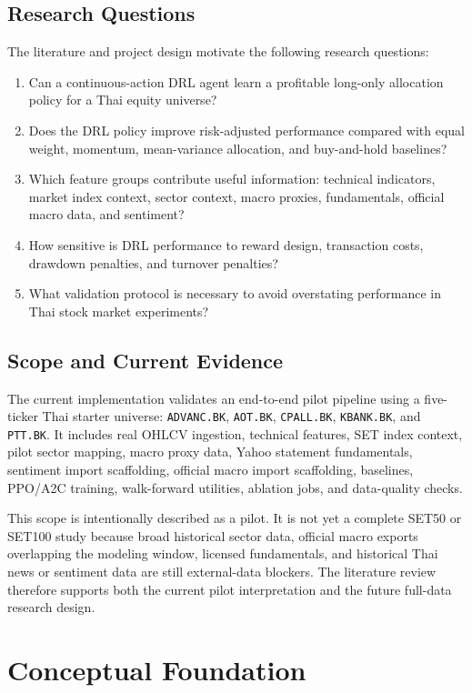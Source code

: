 \documentclass[11pt]{article}
\begin{document}
\subsection{Research Questions}
The literature and project design motivate the following research questions:
\begin{enumerate}
    \item Can a continuous-action DRL agent learn a profitable long-only allocation policy for a Thai equity universe?
    \item Does the DRL policy improve risk-adjusted performance compared with equal weight, momentum, mean-variance allocation, and buy-and-hold baselines?
    \item Which feature groups contribute useful information: technical indicators, market index context, sector context, macro proxies, fundamentals, official macro data, and sentiment?
    \item How sensitive is DRL performance to reward design, transaction costs, drawdown penalties, and turnover penalties?
    \item What validation protocol is necessary to avoid overstating performance in Thai stock market experiments?
\end{enumerate}

\subsection{Scope and Current Evidence}
The current implementation validates an end-to-end pilot pipeline using a five-ticker Thai starter universe: \texttt{ADVANC.BK}, \texttt{AOT.BK}, \texttt{CPALL.BK}, \texttt{KBANK.BK}, and \texttt{PTT.BK}. It includes real OHLCV ingestion, technical features, SET index context, pilot sector mapping, macro proxy data, Yahoo statement fundamentals, sentiment import scaffolding, official macro import scaffolding, baselines, PPO/A2C training, walk-forward utilities, ablation jobs, and data-quality checks.

This scope is intentionally described as a pilot. It is not yet a complete SET50 or SET100 study because broad historical sector data, official macro exports overlapping the modeling window, licensed fundamentals, and historical Thai news or sentiment data are still external-data blockers. The literature review therefore supports both the current pilot interpretation and the future full-data research design.

\section{Conceptual Foundation}
\end{document}
